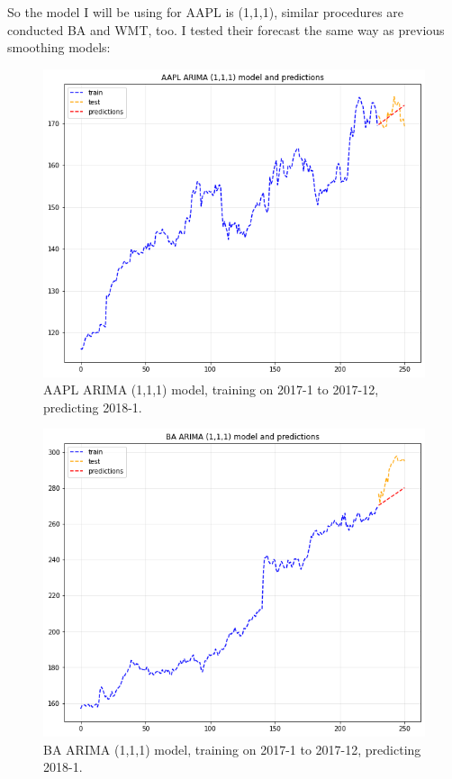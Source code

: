\documentclass[11pt]{article}
\begin{document}
So the model I will be using for AAPL is (1,1,1), similar procedures are conducted BA and WMT, too.
I tested their forecast the same way as previous smoothing models:

\begin{figure}[h!]
\centerline{\includegraphics[scale=0.5]{arima_p1.png}}
\caption{AAPL ARIMA (1,1,1) model, training on 2017-1 to 2017-12, predicting 2018-1.}
\end{figure}

\begin{figure}[h!]
\centerline{\includegraphics[scale=0.5]{arima_p2.png}}
\caption{BA ARIMA (1,1,1) model, training on 2017-1 to 2017-12, predicting 2018-1.}
\end{figure}
\end{document}
